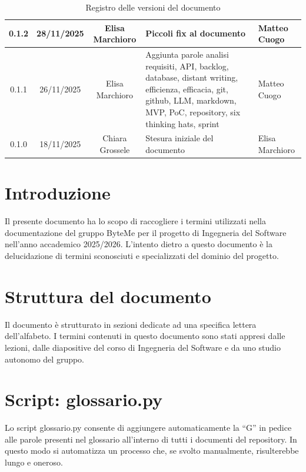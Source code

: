 \documentclass[11pt,a4paper]{article}
\begin{document}
\begin{table}[H]
\begin{tabular}{|c|c|c|>{\raggedright\arraybackslash}p{}|p{}|}
        \hline
        0.1.2 & 28/11/2025 & Elisa Marchioro & Piccoli fix al documento & Matteo Cuogo\\
        \hline
        0.1.1 & 26/11/2025 & Elisa Marchioro & Aggiunta parole analisi requisiti, API, backlog, database, distant writing, efficienza, efficacia, git, github, LLM, markdown, MVP, PoC, repository, six thinking hats, sprint & Matteo Cuogo\\
        \hline
        0.1.0 & 18/11/2025 & Chiara Grossele & Stesura iniziale del documento & Elisa Marchioro\\
        \hline
    \end{tabular}
    \caption{Registro delle versioni del documento}
    \label{tab:versionamento}
\end{table}

\newpage

\tableofcontents
\thispagestyle{empty}
\newpage
\setcounter{page}{1}

\section{Introduzione}
Il presente documento ha lo scopo di raccogliere i termini utilizzati nella documentazione del gruppo ByteMe per il progetto di Ingegneria del Software nell'anno accademico 2025/2026.
L'intento dietro a questo documento è la delucidazione di termini sconosciuti e specializzati del dominio del progetto.

\section{Struttura del documento}
Il documento è strutturato in sezioni dedicate ad una specifica lettera dell'alfabeto. I termini contenuti in questo documento sono stati appresi dalle lezioni, dalle diapositive del corso di Ingegneria del Software e da uno studio autonomo del gruppo.

\section{Script: glossario.py}
Lo script glossario.py consente di aggiungere automaticamente la “G” in pedice alle parole presenti nel glossario all’interno di tutti i documenti del repository. In questo modo si automatizza un processo che, se svolto manualmente, risulterebbe lungo e oneroso.
\newpage
\end{document}
